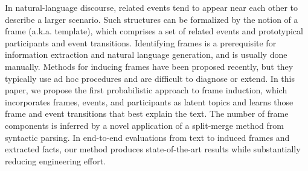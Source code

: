 In natural-language discourse, related events tend to appear near each other to describe a larger scenario. Such structures can be formalized by the notion of
 a frame (a.k.a. template), which comprises a set of related events and
 prototypical participants and event transitions. Identifying frames is a
 prerequisite for information extraction and natural language generation, and is
 usually done manually. Methods for inducing frames have been proposed recently,
 but they typically use ad hoc procedures and are difficult to diagnose or
 extend. In this paper, we propose the first probabilistic approach to frame
 induction, which incorporates frames, events, and participants as latent topics
 and learns those frame and event transitions that best explain the text. The
 number of frame components is inferred by a novel application of a split-merge
 method from syntactic parsing. In end-to-end evaluations from text to induced
 frames and extracted facts, our method produces state-of-the-art results while
 substantially reducing engineering effort.

